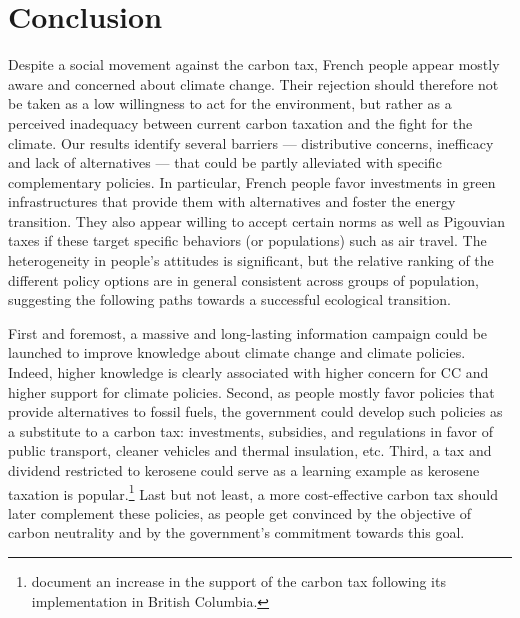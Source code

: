 \documentclass[english,5p,authoryear]{elsarticle}
\begin{document}
%

%

%

%

%

%

%

\section{Conclusion}\label{sec:conclusion}

%

%
%
Despite a social movement against the carbon tax, French people appear mostly aware and concerned about climate change. Their rejection should therefore not be taken as a low willingness to act for the environment, but rather as a perceived inadequacy between current carbon taxation and the fight for the climate. Our results identify several barriers --- distributive concerns, inefficacy and lack of alternatives --- that could be partly alleviated with specific complementary policies. In particular, French people favor investments in green infrastructures that provide them with alternatives and foster the energy transition. They also appear willing to accept certain norms as well as Pigouvian taxes if these target specific behaviors (or populations) such as air travel. The heterogeneity in people's attitudes is significant, but the relative ranking of the different policy options are in general consistent across groups of population, suggesting the following paths towards a successful ecological transition.
%
%


%
First and foremost, a massive and long-lasting information campaign could be launched to improve knowledge about climate change and climate policies. Indeed, higher knowledge is clearly associated with higher concern for CC and higher support for climate policies. Second, as people mostly favor policies that provide alternatives to fossil fuels, the government could develop such policies as a substitute to a carbon tax: investments, subsidies, and regulations in favor of public transport, cleaner vehicles and thermal insulation, etc. Third, a tax and dividend restricted to kerosene could serve as a learning example as kerosene taxation is popular.\footnote{\citet{murray_british_2015} document an increase in the support of the carbon tax following its implementation in British Columbia.} Last but not least, a more cost-effective carbon tax should later complement these policies, as people get convinced by the objective of carbon neutrality and by the government's commitment towards this goal. 
\end{document}
